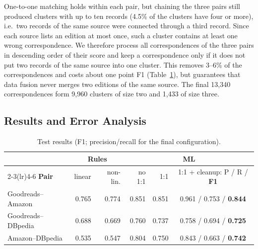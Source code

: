 \documentclass[runningheads]{llncs}
\begin{document}
One-to-one matching holds within each pair, but chaining the three pairs still
produced clusters with up to ten records (4.5\% of the clusters have four or
more), i.e.\ two records of the same source were connected through a third
record. Since each source lists an edition at most once, such a cluster contains
at least one wrong correspondence. We therefore process all correspondences of
the three pairs in descending order of their score and keep a correspondence
only if it does not put two records of the same source into one cluster. This
removes 3--6\% of the correspondences and costs about one point F1
(Table~\ref{tab:irresults}), but guarantees that data fusion never merges two
editions of the same source. The final 13,340 correspondences form 9,960
clusters of size two and 1,433 of size three.

\subsection{Results and Error Analysis}\label{sec:irresults}

\begin{table}[htbp]
\centering
\caption{Test results (F1; precision/recall for the final configuration).}
\label{tab:irresults}
\footnotesize\setlength{\tabcolsep}{4pt}
\begin{tabular}{lrrrrc}
\toprule
 & \multicolumn{2}{c}{\textbf{Rules}} & \multicolumn{3}{c}{\textbf{ML}} \\
\cmidrule(lr){2-3}\cmidrule(lr){4-6}
\textbf{Pair} & linear & non-lin. & no 1:1 & 1:1 & 1:1 + cleanup: P / R / \textbf{F1} \\
\midrule
Goodreads--Amazon  & 0.765 & 0.774 & 0.851 & 0.851 & 0.961 / 0.753 / \textbf{0.844} \\
Goodreads--DBpedia & 0.688 & 0.669 & 0.760 & 0.737 & 0.758 / 0.694 / \textbf{0.725} \\
Amazon--DBpedia    & 0.535 & 0.547 & 0.804 & 0.750 & 0.843 / 0.663 / \textbf{0.742} \\
\bottomrule
\end{tabular}
\end{table}

\end{document}
